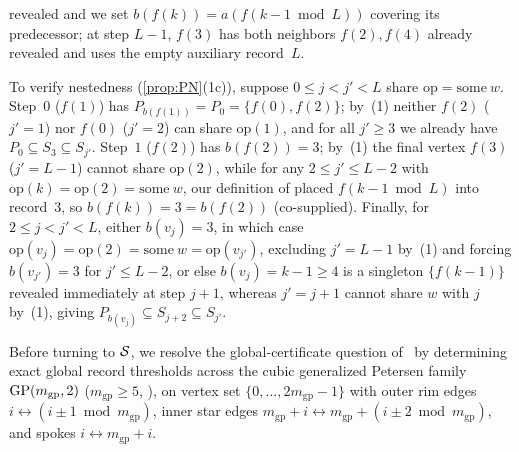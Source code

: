 \begin{outline}
\begin{itemize}
  revealed and we set $b(f(k)) = a(f(k - 1 \bmod L))$ covering its predecessor; at step $L - 1$, $f(3)$ has both neighbors
  $f(2), f(4)$ already revealed and uses the empty auxiliary record~$L$.
\end{itemize}
To verify nestedness (\cref{prop:PN}(1c)), suppose $0 \le j < j' < L$ share $\mathrm{op} = \mathrm{some}\ w$. Step~$0$
($f(1)$) has $P_{b(f(1))} = P_0 = \{f(0), f(2)\}$; by~(1) neither $f(2)$ ($j' = 1$) nor $f(0)$ ($j' = 2$) can share
$\mathrm{op}(1)$, and for all $j' \ge 3$ we already have $P_0 \subseteq S_3 \subseteq S_{j'}$. Step~$1$ ($f(2)$) has
$b(f(2)) = 3$; by~(1) the final vertex $f(3)$ ($j' = L - 1$) cannot share $\mathrm{op}(2)$, while for any $2 \le j' \le
L - 2$ with $\mathrm{op}(k) = \mathrm{op}(2) = \mathrm{some}\ w$, our definition of  placed $f(k - 1 \bmod L)$
into record~$3$, so $b(f(k)) = 3 = b(f(2))$ (co-supplied). Finally, for $2 \le j < j' < L$, either $b(v_j) = 3$, in which
case $\mathrm{op}(v_j) = \mathrm{op}(2) = \mathrm{some}\ w = \mathrm{op}(v_{j'})$, excluding $j' = L - 1$ by~(1) and
forcing $b(v_{j'}) = 3$ for $j' \le L - 2$, or else $b(v_j) = k - 1 \ge 4$ is a singleton $\{f(k-1)\}$ revealed
immediately at step $j + 1$, whereas $j' = j + 1$ cannot share $w$ with $j$ by~(1), giving $P_{b(v_j)} \subseteq S_{j+2}
\subseteq S_{j'}$.
\end{outline}

Before turning to $\mathcal{S}$, we resolve the global-certificate question of~\cite[Remark~7.5; Section~9.2, item~6]{SeventhPaper2026} by
determining exact global record thresholds across the cubic generalized Petersen family $\operatorname{GP}(m_{\mathrm{gp}}, 2)$
($m_{\mathrm{gp}} \ge 5$, ), on vertex set $\{0, \dots, 2 m_{\mathrm{gp}} - 1\}$ with outer rim edges
$i \leftrightarrow (i \pm 1 \bmod m_{\mathrm{gp}})$, inner star edges $m_{\mathrm{gp}} + i \leftrightarrow m_{\mathrm{gp}} +
(i \pm 2 \bmod m_{\mathrm{gp}})$, and spokes $i \leftrightarrow m_{\mathrm{gp}} + i$.


